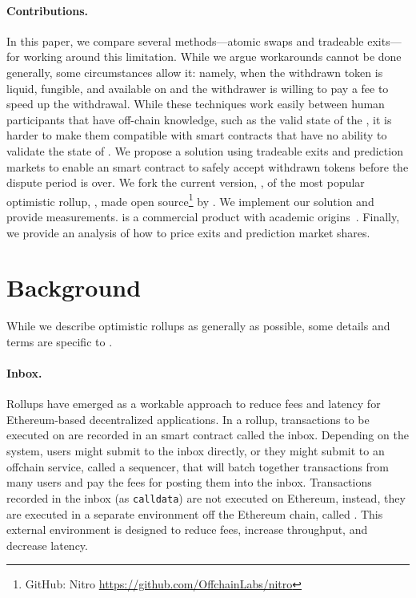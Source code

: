 \paragraph*{Contributions.} In this paper, we compare several methods---atomic swaps and tradeable exits---for working around this limitation. While we argue workarounds cannot be done generally, some circumstances allow it: namely, when the withdrawn token is liquid, fungible, and available on \layerone and the withdrawer is willing to pay a fee to speed up the withdrawal.  While these techniques work easily between human participants that have off-chain knowledge, such as the valid state of the \layertwo, it is harder to make them compatible with \layerone smart contracts that have no ability to validate the state of \layertwo. We propose a solution using tradeable exits and prediction markets to enable an \layerone smart contract to safely accept withdrawn tokens before the dispute period is over. We fork the current version, \nitro, of the most popular optimistic rollup, \arb, made open source\footnote{GitHub: Nitro \url{https://github.com/OffchainLabs/nitro}} by \offchain. We implement our solution and provide measurements. \arb is a commercial product with academic origins~\cite{kalodner2018arbitrum}. Finally, we provide an analysis of how to price exits and prediction market shares.  


 

\section{Background} 

While we describe optimistic rollups as generally as possible, some details and terms are specific to \arb. 

\paragraph*{Inbox.} Rollups have emerged as a workable approach to reduce fees and latency for Ethereum-based decentralized applications. In a rollup,  transactions to be executed on \layertwo are recorded in an \layerone smart contract called the inbox. Depending on the system, users might submit to the inbox directly, or they might submit to an offchain service, called a sequencer, that will batch together transactions from many users and pay the \layerone fees for posting them into the inbox. Transactions recorded in the inbox (as \texttt{calldata}) are not executed on Ethereum, instead, they are executed in a separate environment off the Ethereum chain, called \layertwo. This external environment is designed to reduce fees, increase throughput, and decrease latency. 

